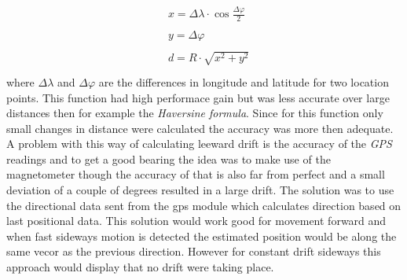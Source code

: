 \begin{align*}
  &\begin{aligned}
  x = \Delta\lambda \cdot \cos\frac{\Delta\varphi}{2}
  \end{aligned}\\
 &\begin{aligned}
  y = \Delta\varphi
  \end{aligned}\\
 &\begin{aligned}
  d = R\cdot\sqrt{x^2+y^2}
  \end{aligned}\\
\end{align*}
where $\Delta\lambda$ and $\Delta\varphi$ are the differences in longitude and latitude for two location points. This function had high performace gain but was less accurate over large distances then for example the \textit{Haversine formula}\cite{haversine}. Since for this function only small changes in distance were calculated the accuracy was more then adequate. A problem with this way of calculating leeward drift is the accuracy of the \textit{GPS} readings and to get a good bearing the idea was to make use of the magnetometer though the accuracy of that is also far from perfect and a small deviation of a couple of degrees resulted in a large drift. The solution was to use the directional data sent from the gps module which calculates direction based on last positional data. This solution would work good for movement forward and when fast sideways motion is detected the estimated position would be along the same vecor as the previous direction. However for constant drift sideways this approach would display that no drift were taking place.


























